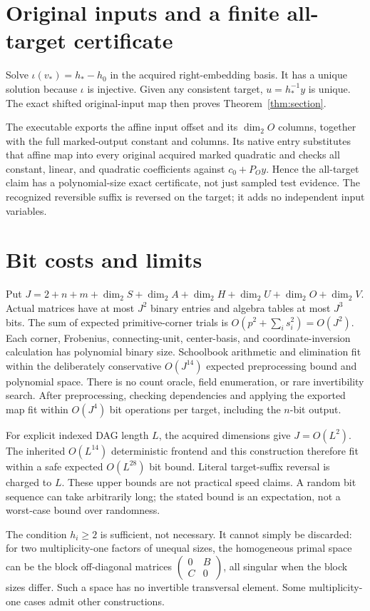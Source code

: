 \documentclass[11pt]{article}
\begin{document}
\section{Original inputs and a finite all-target certificate}

Solve $\iota(v_*)=h_*-h_0$ in the acquired right-embedding basis. It has
a unique solution because $\iota$ is injective. Given any consistent
target, $u=h_*^{-1}y$ is unique. The exact shifted original-input map then
proves Theorem~\ref{thm:section}.

The executable exports the affine input offset and its $\dim_2O$ columns,
together with the full marked-output constant and columns. Its native entry
substitutes that affine map into every original acquired marked quadratic
and checks all constant, linear, and quadratic coefficients against
$c_0+P_Oy$. Hence the all-target claim has a polynomial-size exact
certificate, not just sampled test evidence. The recognized reversible
suffix is reversed on the target; it adds no independent input variables.

\section{Bit costs and limits}

Put $J=2+n+m+\dim_2S+\dim_2A+\dim_2H+\dim_2U+\dim_2O+\dim_2V$.
Actual matrices have at most $J^2$ binary entries and algebra tables at most
$J^3$ bits. The sum of expected primitive-corner trials is
$O(p^2+\sum_i s_i^2)=O(J^2)$. Each corner, Frobenius, connecting-unit,
center-basis, and coordinate-inversion calculation has polynomial binary
size. Schoolbook arithmetic and elimination fit within the deliberately
conservative $O(J^{14})$ expected preprocessing bound and polynomial space.
There is no count oracle, field enumeration, or rare invertibility search.
After preprocessing, checking dependencies and applying the exported map
fit within $O(J^4)$ bit operations per target, including the $n$-bit output.

For explicit indexed DAG length $L$, the acquired dimensions give
$J=O(L^2)$. The inherited $O(L^{14})$ deterministic frontend and this
construction therefore fit within a safe expected $O(L^{28})$ bit bound.
Literal target-suffix reversal is charged to $L$. These upper bounds are
not practical speed claims. A random bit sequence can take arbitrarily long;
the stated bound is an expectation, not a worst-case bound over randomness.

The condition $h_i\ge2$ is sufficient, not necessary. It cannot simply be
discarded: for two multiplicity-one factors of unequal sizes, the homogeneous
primal space can be the block off-diagonal matrices
$\left(\begin{smallmatrix}0&B\\C&0\end{smallmatrix}\right)$, all singular
when the block sizes differ. Such a space has no invertible transversal
element. Some multiplicity-one cases admit other constructions.
\end{document}

